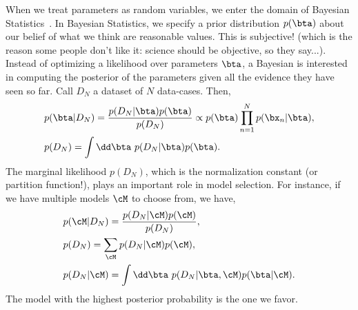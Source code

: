 \documentclass{lecture}
\begin{document}
When we treat parameters as random variables, we enter the domain of Bayesian Statistics~\cite{Gelman2013Bayesian}. In Bayesian Statistics, we specify a prior distribution $p(\bta)$ about our belief of what we think are reasonable values. This is subjective! (which is the reason some people don't like it: science should be objective, so they say...). Instead of optimizing a likelihood over parameters $\bta$, a Bayesian is interested in computing the posterior of the parameters given all the evidence they have seen so far. Call $D_N$ a dataset of $N$ data-cases. Then,
\begin{align}
	 &p(\bta|D_N) = \frac{p(D_N|\bta) p(\bta)}{p(D_N)} \propto p(\bta) \prod_{n=1}^N p(\bx_n|\bta),\\
	 &p(D_N) = \int\dd\bta~p(D_N|\bta)p(\bta).
\end{align}
The marginal likelihood $p(D_N)$, which is the normalization constant (or partition function!), plays an important role in model selection. For instance, if we have multiple models $\cM$ to choose from, we have,
\begin{align}
	 &p(\cM|D_N) = \frac{p(D_N|\cM)p(\cM)}{p(D_N)},\\
	 &p(D_N) = \sum_{\cM} p(D_N|\cM)p(\cM),\\
	 &p(D_N|\cM) = \int\dd\bta~p(D_N|\bta,\cM)p(\bta|\cM).
\end{align}
The model with the highest posterior probability is the one we favor.
\end{document}
